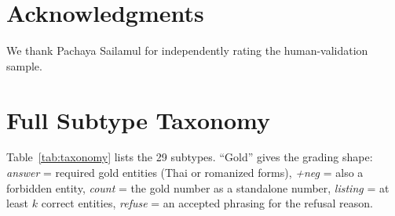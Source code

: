 \documentclass[11pt]{article}
\begin{document}
\section*{Acknowledgments}

We thank Pachaya Sailamul for independently rating the human-validation sample.



\appendix

\section{Full Subtype Taxonomy}
\label{app:tax}

Table~\ref{tab:taxonomy} lists the 29 subtypes. ``Gold'' gives the grading shape: \emph{answer} = required gold entities (Thai or romanized
forms), \emph{+neg} = also a forbidden entity, \emph{count} = the gold number as a standalone number,
\emph{listing} = at least $k$ correct entities, \emph{refuse} = an accepted phrasing for the refusal
reason.
\end{document}
